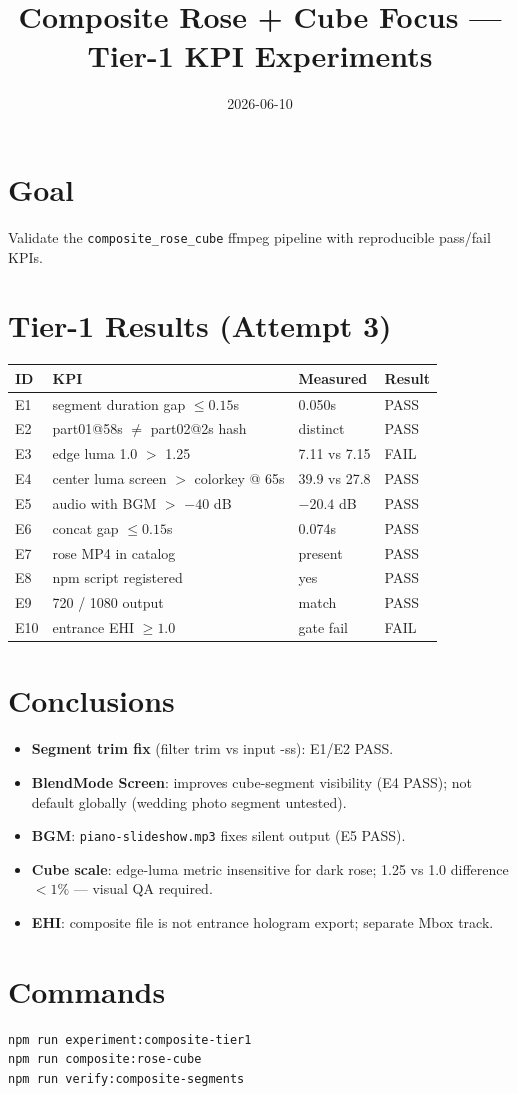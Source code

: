 \documentclass{article}
\title{Composite Rose + Cube Focus --- Tier-1 KPI Experiments}
\date{2026-06-10}
\begin{document}
\maketitle

\section{Goal}
Validate the \texttt{composite\_rose\_cube} ffmpeg pipeline with reproducible pass/fail KPIs.

\section{Tier-1 Results (Attempt 3)}
\begin{tabular}{@{}llll@{}}
\toprule
ID & KPI & Measured & Result \\
\midrule
E1 & segment duration gap $\leq 0.15$s & 0.050s & PASS \\
E2 & part01@58s $\neq$ part02@2s hash & distinct & PASS \\
E3 & edge luma 1.0 $>$ 1.25 & 7.11 vs 7.15 & FAIL \\
E4 & center luma screen $>$ colorkey @ 65s & 39.9 vs 27.8 & PASS \\
E5 & audio with BGM $>$ $-40$ dB & $-20.4$ dB & PASS \\
E6 & concat gap $\leq 0.15$s & 0.074s & PASS \\
E7 & rose MP4 in catalog & present & PASS \\
E8 & npm script registered & yes & PASS \\
E9 & 720 / 1080 output & match & PASS \\
E10 & entrance EHI $\geq 1.0$ & gate fail & FAIL \\
\bottomrule
\end{tabular}

\section{Conclusions}
\begin{itemize}
  \item \textbf{Segment trim fix} (filter trim vs input -ss): E1/E2 PASS.
  \item \textbf{BlendMode Screen}: improves cube-segment visibility (E4 PASS); not default globally (wedding photo segment untested).
  \item \textbf{BGM}: \texttt{piano-slideshow.mp3} fixes silent output (E5 PASS).
  \item \textbf{Cube scale}: edge-luma metric insensitive for dark rose; 1.25 vs 1.0 difference $<1\%$ --- visual QA required.
  \item \textbf{EHI}: composite file is not entrance hologram export; separate Mbox track.
\end{itemize}

\section{Commands}
\begin{verbatim}
npm run experiment:composite-tier1
npm run composite:rose-cube
npm run verify:composite-segments
\end{verbatim}
\end{document}
